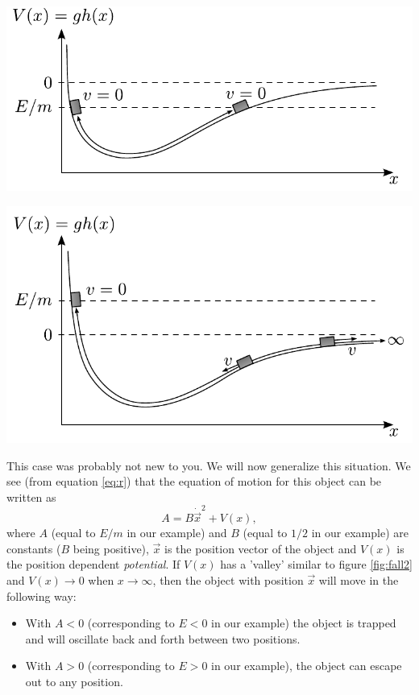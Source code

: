 \begin{multicols}{2}
\begin{Figure}
\centering
\includegraphics[width=\textwidth]{fig_17-4.pdf}
\end{Figure}
\begin{Figure}
\centering
\includegraphics[width=\textwidth]{fig_17-5.pdf}
\end{Figure}


This case was probably not new to you. We will now generalize this situation. We see (from equation \ref{eq:r}) that the equation of motion for this object can be written as
\begin{equation}
\label{eq:general}
A=B\dot{\vec{x}}^2+V(x),
\end{equation}
where $A$ (equal to $E/m$ in our example) and $B$ (equal to $1/2$ in our example) are constants ($B$ being positive), $\vec{x}$ is the position vector of the object and $V(x)$ is the position dependent {\it potential}. If $V(x)$ has a 'valley' similar to figure \ref{fig:fall2} and $V(x)\rightarrow0$ when $x\rightarrow\infty$, then the object with position $\vec{x}$ will move in the following way:
\begin{itemize}
\item With $A<0$ (corresponding to $E<0$ in our example) the object is trapped and will oscillate back and forth between two positions.
\item With $A>0$ (corresponding to $E>0$ in our example), the object can escape out to any position.
\end{itemize}


\end{multicols}
